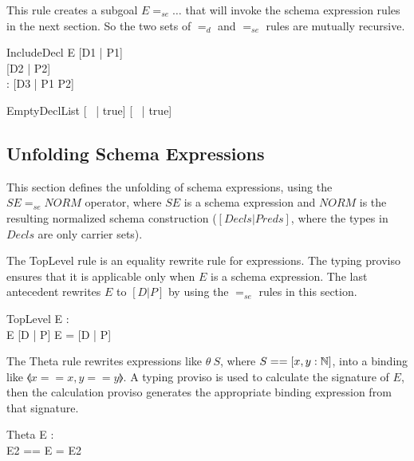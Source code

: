 \documentclass{entcs}
\newcommand{\sexprUnfoldsTo}{\mathrel{=_{se}}}
\newcommand{\declListUnfoldsTo}{\mathrel{=_d}}
\begin{document}
This rule creates a subgoal $E \sexprUnfoldsTo \ldots$ that will
invoke the schema expression rules in the next section.  So the
two sets of $\declListUnfoldsTo$ and $\sexprUnfoldsTo$ rules are
mutually recursive.

\begin{zedrule}{IncludeDecl}
   E \sexprUnfoldsTo [D1 | P1] \\
   [D | true] \declListUnfoldsTo [D2 | P2] \\
   \proviso [D1 | true] \land [D2 | true] : \power [D3]
\derives
   [E; D | true] \declListUnfoldsTo [D3 |  P1 \land P2]
\end{zedrule}

\begin{zedrule}{EmptyDeclList}
   [~ | true] \declListUnfoldsTo [~ | true]
\end{zedrule}


\subsection{Unfolding Schema Expressions}

This section defines the unfolding of schema expressions,
using the $SE \sexprUnfoldsTo NORM$ operator, where $SE$
is a schema expression and $NORM$ is the resulting normalized
schema construction ($[Decls|Preds]$, where the types in $Decls$
are only carrier sets).

The TopLevel rule is an equality rewrite rule for expressions.
The typing proviso ensures that it is applicable only when $E$
is a schema expression.  The last antecedent rewrites $E$ to
$[D | P]$ by using the $\sexprUnfoldsTo$ rules in this section.

\begin{zedrule}{TopLevel}
  \proviso E : \power [D2] \\
  E  \sexprUnfoldsTo [D | P]
\derives
  E = [D | P]
\end{zedrule}

The Theta rule rewrites expressions like $\theta~S$, where
$S==[x,y:{\mathbb N}]$, into a binding like $\lblot x==x,y==y \rblot$.
A typing proviso is used to calculate the signature of $E$, then
the calculation proviso generates the appropriate binding expression
from that signature.
\begin{zedrule}{Theta}
  \proviso E : \power [D] \\
  \proviso E2 == \theta [D | true]
\derives
  \theta E = E2
\end{zedrule}
\end{document}
